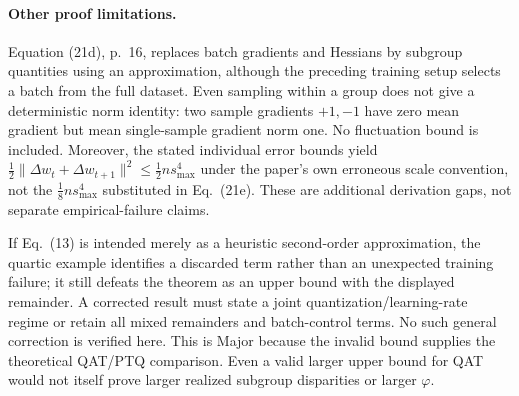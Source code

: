 \documentclass[10pt]{article}
\begin{document}
\paragraph*{Other proof limitations.}\mbox{}\par
Equation (21d), p. 16, replaces batch gradients and Hessians by subgroup quantities using an approximation, although the preceding training setup selects a batch from the full dataset. Even sampling within a group does not give a deterministic norm identity: two sample gradients \(+1,-1\) have zero mean gradient but mean single-sample gradient norm one. No fluctuation bound is included. Moreover, the stated individual error bounds yield \(\frac12\|\Delta w_t+\Delta w_{t+1}\|^2\le\frac12ns_{\max}^4\) under the paper’s own erroneous scale convention, not the \(\frac18ns_{\max}^4\) substituted in Eq. (21e). These are additional derivation gaps, not separate empirical-failure claims.\par
If Eq. (13) is intended merely as a heuristic second-order approximation, the quartic example identifies a discarded term rather than an unexpected training failure; it still defeats the theorem as an upper bound with the displayed remainder. A corrected result must state a joint quantization/learning-rate regime or retain all mixed remainders and batch-control terms. No such general correction is verified here. This is Major because the invalid bound supplies the theoretical QAT/PTQ comparison. Even a valid larger upper bound for QAT would not itself prove larger realized subgroup disparities or larger \(\varphi\).\par
\end{document}
